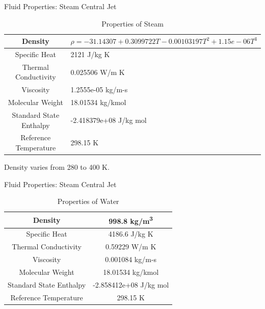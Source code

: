 \begin{frame}{Fluid Properties: Steam Central Jet}
    \begin{table}[h]
        \centering
        \caption{Properties of Steam}
        \label{tab:steamprop}
        \begin{tabular}{|c|p{3cm}|}
        \hline
            Density  & $\rho = -31.14307 + 0.3099722 T - 0.00103197 T^{2} + 1.15e-06 T^{3}$\\
        \hline
            Specific Heat &  2121 J/kg K \\
        \hline
            Thermal Conductivity & 0.025506 W/m K \\
        \hline
            Viscosity & 1.2555e-05 kg/m-s \\
        \hline
            Molecular Weight & 18.01534 kg/kmol \\
        \hline
            Standard State Enthalpy & -2.418379e+08 J/kg mol \\
        \hline
            Reference Temperature & 298.15 K \\
        \hline
        \end{tabular}
    \end{table}
    Density varies from 280 to 400 K.
\end{frame}

\begin{frame}{Fluid Properties: Steam Central Jet}
    \begin{table}[h]
        \centering
        \caption{Properties of Water}
        \label{tab:waterprop}
        \begin{tabular}{|c|c|}
        \hline
            Density  & 998.8 kg/m\textsuperscript{3}\\
        \hline
            Specific Heat &  4186.6 J/kg K \\
        \hline
            Thermal Conductivity & 0.59229 W/m K \\
        \hline
            Viscosity & 0.001084 kg/m-s \\
        \hline
            Molecular Weight & 18.01534 kg/kmol \\
        \hline
            Standard State Enthalpy & -2.858412e+08 J/kg mol \\
        \hline
            Reference Temperature & 298.15 K \\
        \hline
        \end{tabular}
    \end{table}
\end{frame}

